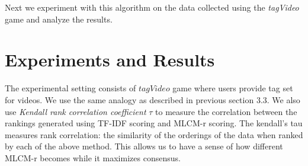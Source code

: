 \documentclass[12pt]{report}
\begin{document}
Next we experiment with this algorithm on the data collected using the \emph{tagVideo} game and analyze the results.

\pagebreak
\section{Experiments and Results}
The experimental setting consists of $tagVideo$ game where users provide tag set for videos. We use the same analogy as described in previous section 3.3. We also use \emph{Kendall rank correlation coefficient} $\tau$ to measure the correlation between the rankings generated using TF-IDF scoring and MLCM-r scoring. The kendall's tau measures rank correlation: the similarity of the orderings of the data when ranked by each of the above method. This allows us to have a sense of how different MLCM-r becomes while it maximizes consensus.  
\end{document}
